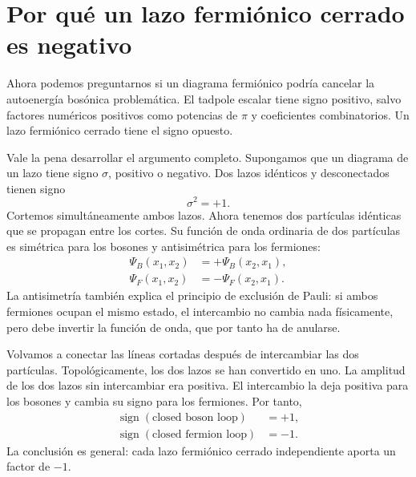 \section{Por qué un lazo fermiónico cerrado es negativo}

Ahora podemos preguntarnos si un diagrama fermiónico podría cancelar la autoenergía bosónica problemática. El tadpole escalar tiene signo positivo, salvo factores numéricos positivos como potencias de \(\pi\) y coeficientes combinatorios. Un lazo fermiónico cerrado tiene el signo opuesto.

\begin{classroomqa}
\end{classroomqa}

Vale la pena desarrollar el argumento completo. Supongamos que un diagrama de un lazo tiene signo \(\sigma\), positivo o negativo. Dos lazos idénticos y desconectados tienen signo
\begin{equation}
\sigma^2=+1.
\end{equation}
Cortemos simultáneamente ambos lazos. Ahora tenemos dos partículas idénticas que se propagan entre los cortes. Su función de onda ordinaria de dos partículas es simétrica para los bosones y antisimétrica para los fermiones:
\begin{align}
\Psi_B(x_1,x_2)&=+\Psi_B(x_2,x_1),\\
\Psi_F(x_1,x_2)&=-\Psi_F(x_2,x_1).
\end{align}
La antisimetría también explica el principio de exclusión de Pauli: si ambos fermiones ocupan el mismo estado, el intercambio no cambia nada físicamente, pero debe invertir la función de onda, que por tanto ha de anularse.

Volvamos a conectar las líneas cortadas después de intercambiar las dos partículas. Topológicamente, los dos lazos se han convertido en uno. La amplitud de los dos lazos sin intercambiar era positiva. El intercambio la deja positiva para los bosones y cambia su signo para los fermiones. Por tanto,
\begin{equation}
\begin{aligned}
\operatorname{sign}(\text{closed boson loop})&=+1,\\
\operatorname{sign}(\text{closed fermion loop})&=-1.
\end{aligned}
\end{equation}
La conclusión es general: cada lazo fermiónico cerrado independiente aporta un factor de \(-1\).

